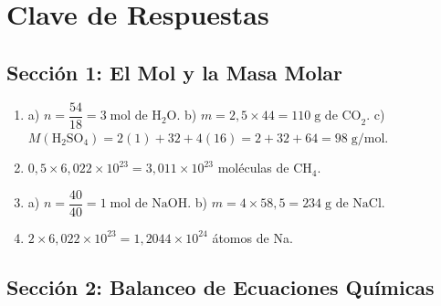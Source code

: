 \documentclass[12pt, letterpaper]{article}
\begin{document}
\newpage

\ifmwclaves
  \section{Clave de Respuestas}

  \subsection*{Sección 1: El Mol y la Masa Molar}

  \begin{enumerate}[leftmargin=*, label=\textbf{\arabic*.}]
    \item a) $n = \dfrac{54}{18} = 3\;\text{mol de H}_2\text{O}$.
          \quad b) $m = 2{,}5 \times 44 = 110\;\text{g de CO}_2$.
          \quad c) $M(\text{H}_2\text{SO}_4) = 2(1) + 32 + 4(16) = 2 + 32 + 64 = 98\;\text{g/mol}$.

    \item $0{,}5 \times 6{,}022 \times 10^{23} = 3{,}011 \times 10^{23}$ moléculas de $\text{CH}_4$.

    \item a) $n = \dfrac{40}{40} = 1\;\text{mol de NaOH}$.
          \quad b) $m = 4 \times 58{,}5 = 234\;\text{g de NaCl}$.

    \item $2 \times 6{,}022 \times 10^{23} = 1{,}2044 \times 10^{24}$ átomos de Na.
  \end{enumerate}

  \newpage

  \subsection*{Sección 2: Balanceo de Ecuaciones Químicas}
\end{document}
